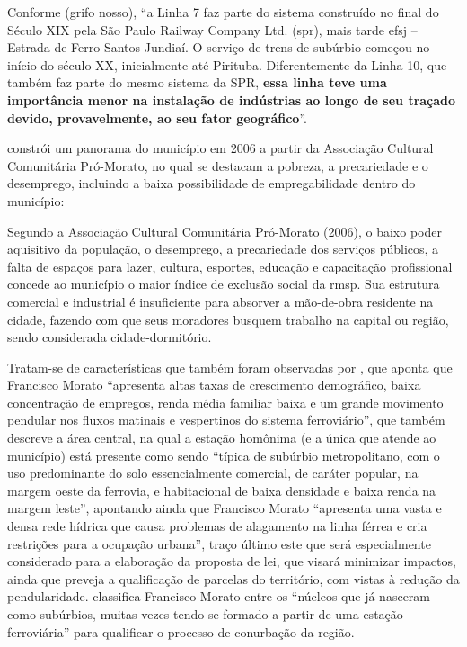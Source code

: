 	Conforme  (grifo nosso), ``a Linha 7 faz parte do sistema construído no final do Século XIX pela São Paulo Railway Company Ltd. (\gls{spr}), mais tarde \gls{efsj} – Estrada de Ferro Santos-Jundiaí. O serviço de trens de subúrbio começou no início do século XX, inicialmente até Pirituba. Diferentemente da Linha 10, que também faz parte do mesmo sistema da SPR, \textbf{essa linha teve uma importância menor na instalação de indústrias ao longo de seu traçado devido, provavelmente, ao seu fator geográfico}''.
	
	
	 constrói um panorama do município em 2006 a partir da Associação Cultural Comunitária Pró-Morato, no qual se destacam a pobreza, a precariedade e o desemprego, incluindo a baixa possibilidade de empregabilidade dentro do município:
	
	\begin{citacao}
		Segundo a Associação Cultural Comunitária Pró-Morato (2006), o baixo poder aquisitivo da população, o desemprego, a precariedade dos serviços públicos, a falta de espaços para lazer, cultura, esportes, educação e capacitação profissional concede ao município o maior índice de exclusão social da \gls{rmsp}. Sua estrutura comercial e industrial é insuficiente para absorver a mão-de-obra residente na cidade, fazendo com que seus moradores busquem trabalho na capital ou região, sendo considerada cidade-dormitório.
	\end{citacao}
	
	Tratam-se de características que também foram observadas por , que aponta que Francisco Morato ``apresenta altas taxas de crescimento demográfico,	baixa concentração de empregos, renda	média familiar baixa e um grande movimento pendular nos fluxos matinais e vespertinos do sistema ferroviário'', que também descreve a área central, na qual a estação homônima (e a única que atende ao município) está presente como sendo ``típica de subúrbio metropolitano, com o uso predominante do solo essencialmente comercial, de caráter popular, na margem oeste da ferrovia, e habitacional de baixa densidade e baixa renda na margem leste'', apontando ainda que Francisco Morato ``apresenta uma vasta e densa rede hídrica que causa problemas de alagamento na linha férrea e cria restrições para a ocupação urbana'', traço último este que será especialmente considerado para a elaboração da proposta de lei, que visará minimizar impactos, ainda que preveja a qualificação de parcelas do território, com vistas à redução da pendularidade.  classifica Francisco Morato entre os ``núcleos que já nasceram como subúrbios, muitas vezes tendo se formado a partir de uma estação ferroviária'' para qualificar o processo de conurbação da região.
	
